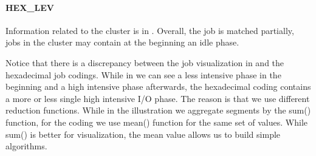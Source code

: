 \documentclass{jhps}
\begin{document}
\FloatBarrier
\paragraph{HEX\_LEV}
Information related to the cluster is in .
Overall, the job is matched partially, jobs in the cluster may contain at the beginning an idle phase.

Notice that there is a discrepancy between the job visualization in  and the hexadecimal job codings.
While in  we can see a less intensive phase in the beginning and a high intensive phase afterwards, the hexadecimal coding contains a more or less single high intensive I/O phase.
The reason is that we use different reduction functions.
While in the illustration we aggregate segments by the sum() function, for the coding we use mean() function for the same set of values.
While sum() is better for visualization, the mean value allows us to build simple algorithms.
\end{document}
